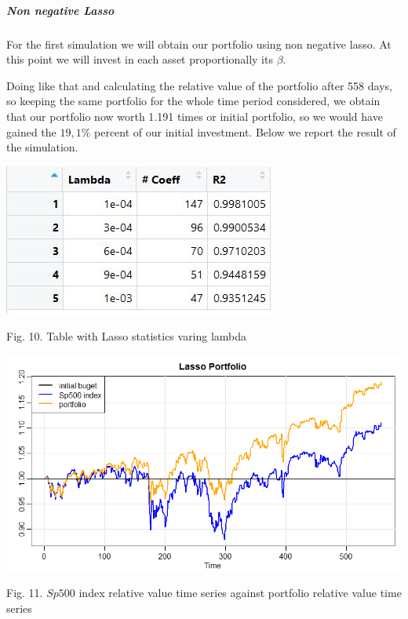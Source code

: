 \documentclass{article}%
\begin{document}
\subparagraph{Non negative Lasso}
For the first simulation we will obtain our portfolio using non negative lasso. At this point we will invest in each asset proportionally its $\beta$. 

Doing like that and calculating the relative value of the portfolio after 558 days, so keeping the same portfolio for the whole time period considered, we obtain that our portfolio now worth  1.191 times or initial portfolio, so we would have gained the $19,1\%$ percent of our initial investment. Below we report the result of the simulation.
\\
\begin{center}
\includegraphics[scale=0.75]{tablasso}
\begin{center}
\begin{small}
Fig. 10. Table with Lasso statistics varing lambda
\\

\end{small}
\end{center}

\end{center}


\includegraphics[scale=0.55]{lassoportfolio}
\begin{center}
\begin{small}
Fig. 11. $Sp500$ index relative value time series against portfolio relative value time series
\\

\end{small}
\end{center}
\end{document}
